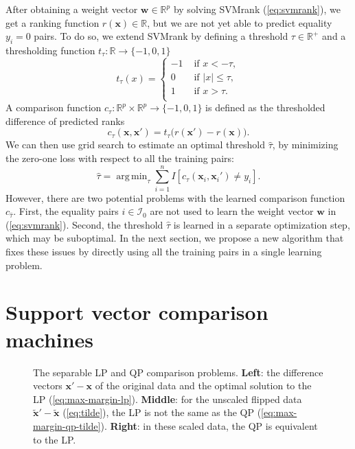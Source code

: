 \documentclass{article}
\newcommand{\RR}{\mathbb R}
\DeclareMathOperator*{\argmin}{arg\,min}
\begin{document}
After obtaining a weight vector $\mathbf w\in\RR^p$ by solving SVMrank
(\ref{eq:svmrank}), we get a ranking function $r(\mathbf x)\in\RR$,
but we are not yet able to predict equality $y_i=0$ pairs. To do so,
we extend SVMrank by defining a threshold $\tau\in\RR^+$ and a
thresholding function $t_\tau:\RR\rightarrow\{-1,0,1\}$
\begin{equation}
  \label{eq:threshold}
  t_\tau(x) = 
  \begin{cases}
    -1 & \text{ if } x < -\tau, \\
    0 & \text{ if } |x| \leq \tau, \\
    1 & \text{ if } x > \tau. \\
  \end{cases}
\end{equation}
A comparison function $c_\tau:\RR^p\times \RR^p\rightarrow \{-1, 0,
1\}$ is defined as the thresholded difference of predicted ranks
\begin{equation}
  \label{eq:compare_general}
  c_\tau(\mathbf x, \mathbf x') = 
  t_\tau\big(
  r(\mathbf x') - r(\mathbf x)
  \big).
\end{equation}
We can then use grid search to estimate an optimal threshold $\hat
\tau$, by minimizing the zero-one loss with respect to all the
training pairs:
\begin{equation}
  \hat \tau = \argmin_{\tau}
  \sum_{i=1}^n
  I\left[ c_\tau(\mathbf x_i, \mathbf x_i') \neq y_i \right].
\end{equation}
However, there are two potential problems with the learned comparison
function $c_{\hat\tau}$. First, the equality pairs $i\in \mathcal I_0$ are not
used to learn the weight vector $\mathbf w$ in (\ref{eq:svmrank}). Second, the
threshold $\hat \tau$ is learned in a separate optimization step,
which may be suboptimal. In the next section, we propose a new
algorithm that fixes these issues by directly using all the
training pairs in a single learning problem.
\section{Support vector comparison machines}
\label{sec:svm-compare}

\begin{figure*}[b!]
  \centering
  
  \vskip -1cm
  \caption{The separable LP and QP comparison problems. \textbf{Left}:
    the difference vectors $\mathbf x'-\mathbf x$ of the original data
    and the optimal solution to the LP
    (\ref{eq:max-margin-lp}). \textbf{Middle}: for the unscaled
    flipped data $\mathbf{\tilde x'}-\mathbf{ \tilde x}$
    (\ref{eq:tilde}), the LP is not the same as the QP
    (\ref{eq:max-margin-qp-tilde}). \textbf{Right}: in these scaled data,
    the QP is equivalent to the LP.}
  \label{fig:hard-margin}
\end{figure*}
\end{document}
